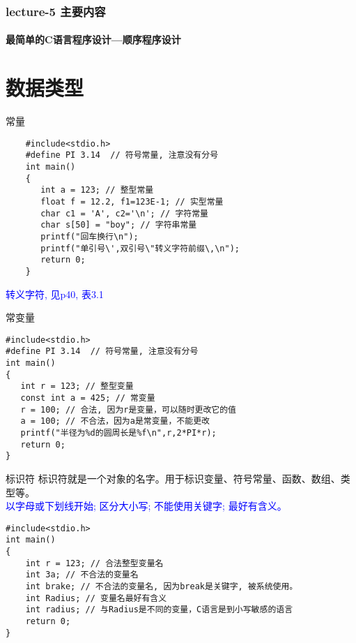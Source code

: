 \begin{frame}
  \frametitle{lecture-5 主要内容}
  \framesubtitle{最简单的C语言程序设计---顺序程序设计}
  \tableofcontents[hideallsubsections]
\end{frame}

\section{数据类型}

\begin{frame}[fragile]{常量}
    \begin{lstlisting}
    #include<stdio.h> 
    #define PI 3.14  // 符号常量, 注意没有分号           
    int main()                   
    {                            
       int a = 123; // 整型常量
       float f = 12.2, f1=123E-1; // 实型常量
       char c1 = 'A', c2='\n'; // 字符常量
       char s[50] = "boy"; // 字符串常量      
       printf("回车换行\n");
       printf("单引号\',双引号\"转义字符前缀\,\n");  
       return 0;           
    }                            
    \end{lstlisting}
    \textcolor{blue}{转义字符, 见p40, 表3.1}
\end{frame}

\begin{frame}[fragile]{常变量}
\begin{lstlisting}
#include<stdio.h> 
#define PI 3.14  // 符号常量, 注意没有分号           
int main()                   
{                            
   int r = 123; // 整型变量
   const int a = 425; // 常变量
   r = 100; // 合法, 因为r是变量，可以随时更改它的值
   a = 100; // 不合法，因为a是常变量，不能更改
   printf("半径为%d的圆周长是%f\n",r,2*PI*r); 
   return 0;           
}                            
\end{lstlisting}
\end{frame}

\begin{frame}[fragile]{标识符}
标识符就是一个对象的名字。用于标识变量、符号常量、函数、数组、类型等。\\
\textcolor{blue}{以字母或下划线开始; 区分大小写; 不能使用关键字; 最好有含义。}
\begin{lstlisting}
#include<stdio.h>           
int main()                   
{                            
    int r = 123; // 合法整型变量名
    int 3a; // 不合法的变量名
    int brake; // 不合法的变量名, 因为break是关键字, 被系统使用。
    int Radius; // 变量名最好有含义
    int radius; // 与Radius是不同的变量，C语言是到小写敏感的语言
    return 0;           
}                            
\end{lstlisting}
\end{frame}

